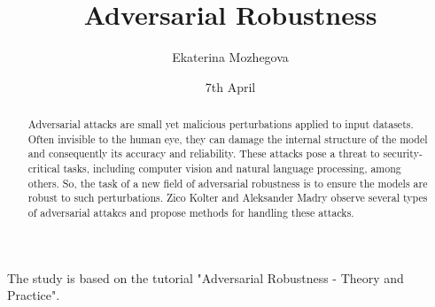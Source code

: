 \documentclass{article}
\title{Adversarial Robustness}
\author{Ekaterina Mozhegova}
\date{7th April}
\begin{document}
\maketitle

The study is based on the tutorial "Adversarial Robustness - Theory and Practice".

\begin{abstract}


  Adversarial attacks are small yet malicious perturbations applied to input datasets. Often invisible to the human eye, they can damage the internal structure of the model and 
  consequently its accuracy and reliability. These attacks pose a threat to security-critical tasks, including computer vision and natural language processing, among others.
  So, the task of a new field of adversarial robustness is to ensure the models are robust to such perturbations. Zico Kolter and Aleksander Madry observe several types of adversarial attakcs and 
  propose methods for handling these attacks.
  
\end{abstract}

\tableofcontents
\newpage




\end{document}
